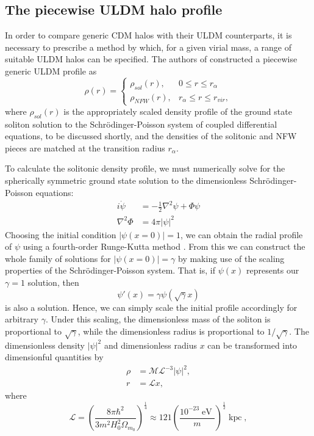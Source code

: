 \documentclass[a4paper,11pt]{article}
\begin{document}
\subsection{The piecewise ULDM halo profile}

In order to compare generic CDM halos with their ULDM counterparts, it is necessary to prescribe a method by which, for a given virial mass, a range of suitable ULDM halos can be specified. The authors of \cite{Bullock} constructed a piecewise generic ULDM profile as
\begin{equation}\label{eq:piecewise}
     \rho(r)=
    \begin{cases}
      \rho_{sol}(r), & 0\leq r \leq r_{\alpha} \\
      \rho_{NFW}(r), & r_{\alpha}\leq r \leq r_{vir},
    \end{cases}
\end{equation}
where $\rho_{sol}(r)$ is the appropriately scaled density profile of the ground state soliton solution to the Schr{\"o}dinger-Poisson system of coupled differential equations, to be discussed shortly, and the densities of the solitonic and NFW pieces are matched at the transition radius $r_{\alpha}$.

To calculate the solitonic density profile, we must numerically solve for the spherically symmetric ground state solution to the dimensionless Schr{\"o}dinger-Poisson equations:
\begin{align}
    i\dot{\psi} &= -\frac{1}{2}\nabla^2\psi+\Phi\psi \\
    \nabla^2\Phi &= 4\pi \vert \psi\vert^2
\end{align}
Choosing the initial condition $\vert\psi(x=0)\vert = 1$, we can obtain the radial profile of $\psi$ using a fourth-order Runge-Kutta method \cite{Edwards:2018ccc}. From this we can construct the whole family of solutions for $\vert\psi(x=0)\vert = \gamma$ by making use of the scaling properties of the Schr{\"o}dinger-Poisson system. That is, if $\psi(x)$ represents our $\gamma = 1$ solution, then
\begin{equation}
    \psi'(x) = \gamma\psi(\sqrt{\gamma}x)
\end{equation}
is also a solution. Hence, we can simply scale the initial profile accordingly for arbitrary $\gamma$. Under this scaling, the dimensionless mass of the soliton is proportional to $\sqrt{\gamma}$, while the dimensionless radius is proportional to $1/\sqrt{\gamma}$. The dimensionless density $\vert\psi\vert^2$ and dimensionless radius $x$ can be transformed into dimensionful quantities by
\begin{align}
    \rho &= \mathcal{M}\mathcal{L}^{-3}\vert\psi\vert^2, \label{eq:density_conv} \\
    r &= \mathcal{L}x, \label{eq:mass_conv}
\end{align}
where
\begin{equation}\label{eq:length}
    \mathcal{L}=\left(\frac{8\pi\hbar^2}{3 m^2H_0^2\Omega_{m_0}}\right)^{\frac{1}{4}}\approx121\left(\frac{10^{-23}\operatorname{eV}}{m}\right)^{\frac{1}{2}}\operatorname{kpc},\label{eq:length}
\end{equation}
\end{document}
